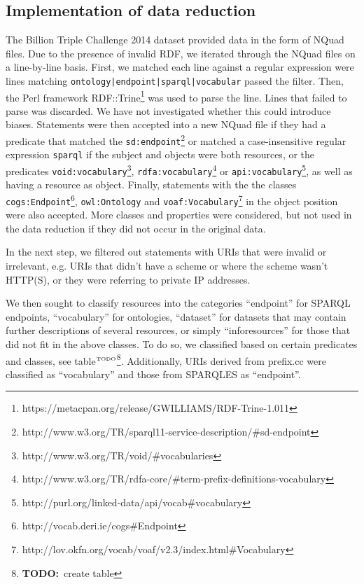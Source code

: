 \documentclass{llncs}
\newcommand{\rdfterm}[1]{\texttt{#1}}
\newcommand{\todo}[1]{\ensuremath{^{\textrm{\tiny{TODO}\normalsize}}}\footnote{\textbf{TODO:}~#1}}
\begin{document}
\begin{subappendices}
\renewcommand{\thesection}{\Alph{section}}%

\section{Implementation of data reduction}\label{app:reduction}

The Billion Triple Challenge 2014 dataset provided data in the form of
NQuad files. Due to the presence of invalid RDF, we iterated through
the NQuad files on a line-by-line basis. First, we matched each line
against a regular expression were lines matching
\texttt{ontology|endpoint|sparql|vocabular} passed the filter. Then,
the Perl framework
RDF::Trine\footnote{https://metacpan.org/release/GWILLIAMS/RDF-Trine-1.011} was used
to parse the line. Lines that failed to parse was discarded. We have
not investigated whether this could introduce biases. Statements were
then accepted into a new NQuad file if they had a predicate that
matched the
\rdfterm{sd:endpoint}\footnote{http://www.w3.org/TR/sparql11-service-description/\#sd-endpoint}
or matched a case-insensitive regular expression \texttt{sparql} if
the subject and objects were both resources, or the predicates
\rdfterm{void:vocabulary}\footnote{http://www.w3.org/TR/void/\#vocabularies},
\rdfterm{rdfa:vocabulary}\footnote{http://www.w3.org/TR/rdfa-core/\#term-prefix-definitions-vocabulary}
or
\rdfterm{api:vocabulary}\footnote{http://purl.org/linked-data/api/vocab\#vocabulary},
as well as having a resource as object. Finally, statements with the
the classes
\rdfterm{cogs:Endpoint}\footnote{http://vocab.deri.ie/cogs\#Endpoint},
\rdfterm{owl:Ontology} and
\rdfterm{voaf:Vocabulary}\footnote{http://lov.okfn.org/vocab/voaf/v2.3/index.html\#Vocabulary}
in the object position were also accepted. More classes and properties
were considered, but not used in the data reduction if they did not
occur in the original data.

In the next step, we filtered out statements with URIs that were
invalid or irrelevant, e.g. URIs that didn't have a scheme or where
the scheme wasn't HTTP(S), or they were referring to private IP addresses.

We then sought to classify resources into the categories ``endpoint''
for SPARQL endpoints, ``vocabulary'' for ontologies, ``dataset'' for
datasets that may contain further descriptions of several resources,
or simply ``inforesources'' for those that did not fit in the above
classes. To do so, we classified based on certain predicates and
classes, see table\todo{create table}. Additionally, URIs derived from
prefix.cc were classified as ``vocabulary'' and those from SPARQLES as
``endpoint''.


\end{subappendices}
\end{document}
